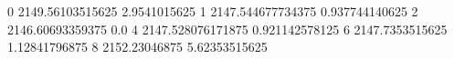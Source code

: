 0 2149.56103515625 2.9541015625
1 2147.544677734375 0.937744140625
2 2146.60693359375 0.0
4 2147.528076171875 0.921142578125
6 2147.7353515625 1.12841796875
8 2152.23046875 5.62353515625
